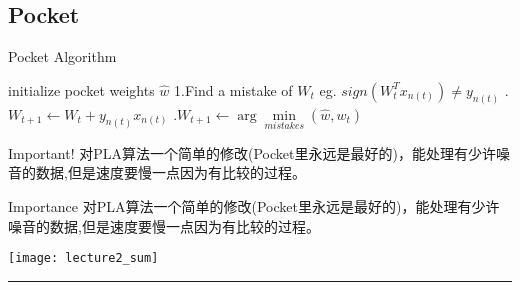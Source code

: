 \subsection{Pocket}
\begin{algorithm}  
\caption{Pocket Algorithm}  
\begin{algorithmic}  
\STATE initialize pocket weights $\hat{w}$
	\STATE 1.Find a \textcolor{Mycolor1}{mistake} of $W_t$
	\STATE eg. $sign(W_{t}^{T}x_{n(t)}) \neq y_{n(t)}$ 
	.$W_{t+1} \gets W_{t} + y_{n(t)}x_{n(t)}$ 
	.$W_{t+1} \gets \arg\underset{mistakes}{\min}(\hat{w},w_t)$
\ENDFOR
\end{algorithmic}  
\end{algorithm}
\par
\begin{bclogo}{Important!}
对PLA算法一个简单的修改(Pocket里永远是最好的)，能处理有少许噪音的数据,但是速度要慢一点因为有比较的过程。 \par
\end{bclogo}
\begin{myremark}{Importance}
对PLA算法一个简单的修改(Pocket里永远是最好的)，能处理有少许噪音的数据,但是速度要慢一点因为有比较的过程。 \par
\end{myremark}

\begin{center}
\texttt{[image: lecture2\_sum]}\\
\end{center}

\noindent
{\color{RubineRed} \rule{\linewidth}{1mm} }